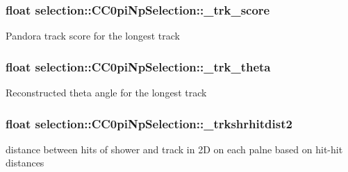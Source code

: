 \subsubsection[{\texorpdfstring{\+\_\+trk\+\_\+score}{_trk_score}}]{\setlength{\rightskip}{0pt plus 5cm}float selection\+::\+C\+C0pi\+Np\+Selection\+::\+\_\+trk\+\_\+score\hspace{0.3cm}{\ttfamily [private]}}\hypertarget{classselection_1_1CC0piNpSelection_a72517a224dc19f95faef3efde9a999d1}{}\label{classselection_1_1CC0piNpSelection_a72517a224dc19f95faef3efde9a999d1}
Pandora track score for the longest track 
\subsubsection[{\texorpdfstring{\+\_\+trk\+\_\+theta}{_trk_theta}}]{\setlength{\rightskip}{0pt plus 5cm}float selection\+::\+C\+C0pi\+Np\+Selection\+::\+\_\+trk\+\_\+theta\hspace{0.3cm}{\ttfamily [private]}}\hypertarget{classselection_1_1CC0piNpSelection_a08cd38de74e9611829a3580a310c19f2}{}\label{classselection_1_1CC0piNpSelection_a08cd38de74e9611829a3580a310c19f2}
Reconstructed theta angle for the longest track 
\subsubsection[{\texorpdfstring{\+\_\+trkshrhitdist2}{_trkshrhitdist2}}]{\setlength{\rightskip}{0pt plus 5cm}float selection\+::\+C\+C0pi\+Np\+Selection\+::\+\_\+trkshrhitdist2\hspace{0.3cm}{\ttfamily [private]}}\hypertarget{classselection_1_1CC0piNpSelection_a75ceddff5c910a6da69588a04d931931}{}\label{classselection_1_1CC0piNpSelection_a75ceddff5c910a6da69588a04d931931}
distance between hits of shower and track in 2D on each palne based on hit-\/hit distances 
